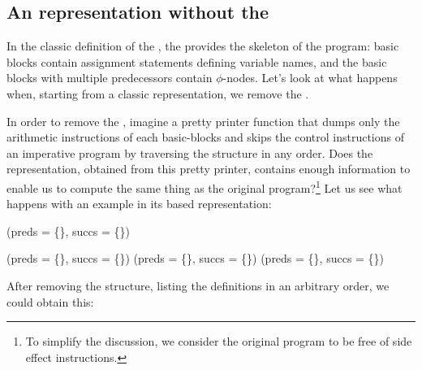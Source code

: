 {\subsection{An \SSA{} representation without the \CFG{}}

In the classic definition of the \SSA{}, the \CFG{} provides the
skeleton of the program: basic blocks contain assignment statements
defining \SSA{} variable names, and the basic blocks with multiple
predecessors contain $\phi$-nodes.  Let's look at what happens when,
starting from a classic \SSA{} representation, we remove the \CFG{}.

In order to remove the \CFG{}, imagine a pretty printer function that dumps only the arithmetic instructions of each basic-blocks and skips the control instructions of an imperative program by traversing the \CFG{} structure in any order.  Does the representation, obtained from
this pretty printer, contains enough information to enable us to
compute the same thing as the original program?\footnote{To simplify the 
discussion, we consider the original program to be free of side effect 
instructions.}
%
Let us see what happens with an example in its \CFG{} based \SSA{} 
representation:

\begin{algorithm}[H]
   (preds = \{\}, succs = \{\})\;

   (preds = \{\}, succs = \{\})\;
   (preds = \{\}, succs = \{\})\;
   (preds = \{\}, succs = \{\})\;
\end{algorithm}

\noindent
After removing the \CFG{} structure, listing the definitions in an
arbitrary order, we could obtain this:

}
